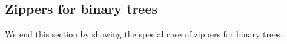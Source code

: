 

\subsection{Zippers for binary trees}

We end this section by showing the special case of zippers for
binary trees.
